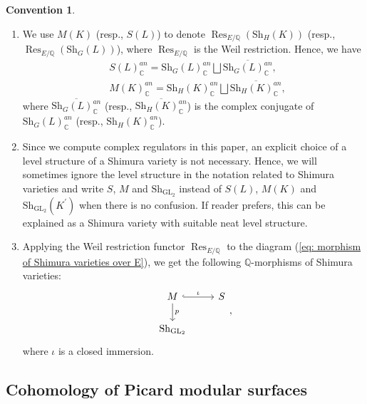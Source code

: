 \documentclass[11pt, a4paper]{amsart}
\theoremstyle{plain}
\theoremstyle{definition}
\newtheorem{convention}[theorem]{Convention}
\numberwithin{equation}{section}
\def\CC{\mathbb{C}}
\def\QQ{\mathbb{Q}}
\DeclareMathOperator{\Res}{Res}
\DeclareMathOperator{\GL}{\mathrm{GL}}
\newcommand{\Sh}{\mathrm{Sh}}
\begin{document}
\begin{convention}
\label{Convention: M_{Q} and S_{Q}}
    \begin{enumerate}
        \item We use $M(K)$ (resp., $S(L)$) to denote $\Res_{E/\QQ}(\Sh_{H}(K))$ (resp., $\Res_{E/\QQ}(\Sh_{G}(L))$), where $\Res_{E/\QQ}$ is the Weil restriction. Hence, we have 
        \begin{align*}
            & S(L)_{\CC}^{an} = \Sh_{G}(L)_{\CC}^{an} \bigsqcup \overline{\Sh_{G}(L)_{\CC}^{an}}, \\
            & M(K)_{\CC}^{an} = \Sh_{H}(K)_{\CC}^{an} \bigsqcup \overline{\Sh_{H}(K)_{\CC}^{an}}, 
        \end{align*}
        where $\overline{\Sh_{G}(L)_{\CC}^{an}}$ (resp., $\overline{\Sh_{H}(K)_{\CC}^{an}}$) is the complex conjugate of $\Sh_{G}(L)_{\CC}^{an}$ (resp., $\Sh_{H}(K)_{\CC}^{an}$). 
        \item Since we compute complex regulators in this paper, an explicit choice of a level structure of a Shimura variety is not necessary. Hence, we will sometimes ignore the level structure in the notation related to Shimura varieties and write $S$, $M$ and $\Sh_{\GL_2}$ instead of $S(L)$, $M(K)$ and $\Sh_{\GL_2}(K^{\prime})$ when there is no confusion. If reader prefers, this can be explained as a Shimura variety with suitable neat level structure. 
        \item Applying the Weil restriction functor $\Res_{E/\QQ}$ to the diagram (\ref{eq: morphism of Shimura varieties over E}), we get the following $\QQ$-morphisms of Shimura varieties: 
        \begin{equation}
        \label{eq: morphism of Shimura varieties over Q}
            \begin{tikzcd}
                M \ar[r, hook, "\iota"] \ar[d, rightarrow, "p"] & S \\
                \Sh_{\GL_2}  &  
            \end{tikzcd},
        \end{equation}
        where $\iota$ is a closed immersion. 
    \end{enumerate}
\end{convention}

\subsection{Cohomology of Picard modular surfaces}
\label{SS: cohomology of Picard modular surfaces}
\end{document}
